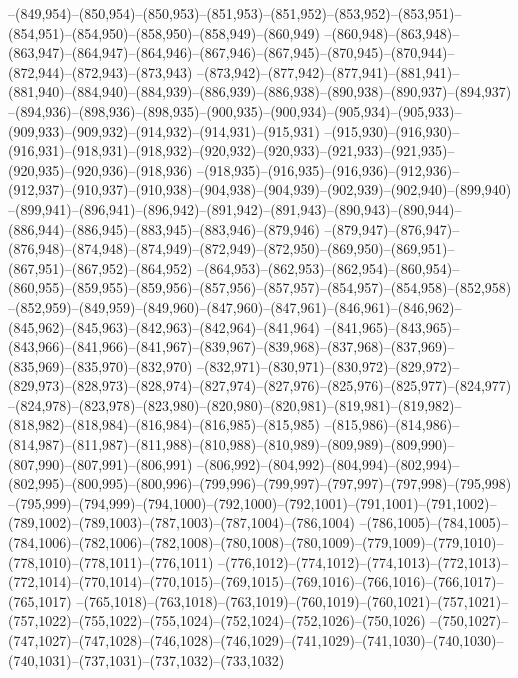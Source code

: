 --(849,954)--(850,954)--(850,953)--(851,953)--(851,952)--(853,952)--(853,951)--(854,951)--(854,950)--(858,950)--(858,949)--(860,949)
--(860,948)--(863,948)--(863,947)--(864,947)--(864,946)--(867,946)--(867,945)--(870,945)--(870,944)--(872,944)--(872,943)--(873,943)
--(873,942)--(877,942)--(877,941)--(881,941)--(881,940)--(884,940)--(884,939)--(886,939)--(886,938)--(890,938)--(890,937)--(894,937)
--(894,936)--(898,936)--(898,935)--(900,935)--(900,934)--(905,934)--(905,933)--(909,933)--(909,932)--(914,932)--(914,931)--(915,931)
--(915,930)--(916,930)--(916,931)--(918,931)--(918,932)--(920,932)--(920,933)--(921,933)--(921,935)--(920,935)--(920,936)--(918,936)
--(918,935)--(916,935)--(916,936)--(912,936)--(912,937)--(910,937)--(910,938)--(904,938)--(904,939)--(902,939)--(902,940)--(899,940)
--(899,941)--(896,941)--(896,942)--(891,942)--(891,943)--(890,943)--(890,944)--(886,944)--(886,945)--(883,945)--(883,946)--(879,946)
--(879,947)--(876,947)--(876,948)--(874,948)--(874,949)--(872,949)--(872,950)--(869,950)--(869,951)--(867,951)--(867,952)--(864,952)
--(864,953)--(862,953)--(862,954)--(860,954)--(860,955)--(859,955)--(859,956)--(857,956)--(857,957)--(854,957)--(854,958)--(852,958)
--(852,959)--(849,959)--(849,960)--(847,960)--(847,961)--(846,961)--(846,962)--(845,962)--(845,963)--(842,963)--(842,964)--(841,964)
--(841,965)--(843,965)--(843,966)--(841,966)--(841,967)--(839,967)--(839,968)--(837,968)--(837,969)--(835,969)--(835,970)--(832,970)
--(832,971)--(830,971)--(830,972)--(829,972)--(829,973)--(828,973)--(828,974)--(827,974)--(827,976)--(825,976)--(825,977)--(824,977)
--(824,978)--(823,978)--(823,980)--(820,980)--(820,981)--(819,981)--(819,982)--(818,982)--(818,984)--(816,984)--(816,985)--(815,985)
--(815,986)--(814,986)--(814,987)--(811,987)--(811,988)--(810,988)--(810,989)--(809,989)--(809,990)--(807,990)--(807,991)--(806,991)
--(806,992)--(804,992)--(804,994)--(802,994)--(802,995)--(800,995)--(800,996)--(799,996)--(799,997)--(797,997)--(797,998)--(795,998)
--(795,999)--(794,999)--(794,1000)--(792,1000)--(792,1001)--(791,1001)--(791,1002)--(789,1002)--(789,1003)--(787,1003)--(787,1004)--(786,1004)
--(786,1005)--(784,1005)--(784,1006)--(782,1006)--(782,1008)--(780,1008)--(780,1009)--(779,1009)--(779,1010)--(778,1010)--(778,1011)--(776,1011)
--(776,1012)--(774,1012)--(774,1013)--(772,1013)--(772,1014)--(770,1014)--(770,1015)--(769,1015)--(769,1016)--(766,1016)--(766,1017)--(765,1017)
--(765,1018)--(763,1018)--(763,1019)--(760,1019)--(760,1021)--(757,1021)--(757,1022)--(755,1022)--(755,1024)--(752,1024)--(752,1026)--(750,1026)
--(750,1027)--(747,1027)--(747,1028)--(746,1028)--(746,1029)--(741,1029)--(741,1030)--(740,1030)--(740,1031)--(737,1031)--(737,1032)--(733,1032)
